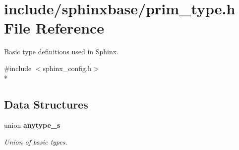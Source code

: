 \section{include/sphinxbase/prim\-\_\-type.h File Reference}
\label{prim__type_8h}


Basic type definitions used in Sphinx.  


{\ttfamily \#include $<$sphinx\-\_\-config.\-h$>$}\\*
\subsection*{Data Structures}
\begin{DoxyCompactItemize}
\item 
union {\bf anytype\-\_\-s}
\begin{DoxyCompactList}\small\item\em Union of basic types. \end{DoxyCompactList}\end{DoxyCompactItemize}
